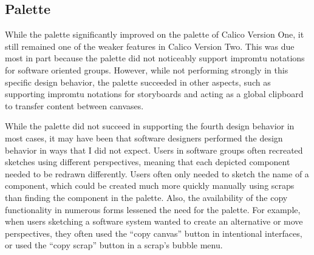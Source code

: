 \documentclass[12pt,fleqn]{ucithesis}
\begin{document}
	

\subsection{Palette}

While the palette significantly improved on the palette of Calico Version One, it still remained one of the weaker features in Calico Version Two. This was due most in part because the palette did not noticeably support impromtu notations for software oriented groups. However, while not performing strongly in this specific design behavior, the palette succeeded in other aspects, such as supporting impromtu notations for storyboards and acting as a global clipboard to transfer content between canvases.

While the palette did not succeed in supporting the fourth design behavior in most cases, it may have been that software designers performed the design behavior in ways that I did not expect. Users in software groups often recreated sketches using different perspectives, meaning that each depicted component needed to be redrawn differently. Users often only needed to sketch the name of a component, which could be created much more quickly manually using scraps than finding the component in the palette. Also, the availability of the copy functionality in numerous forms lessened the need for the palette. For example, when users sketching a software system wanted to create an alternative or move perspectives, they often used the ``copy canvas'' button in intentional interfaces, or used the ``copy scrap'' button in a scrap's bubble menu.
\end{document}
